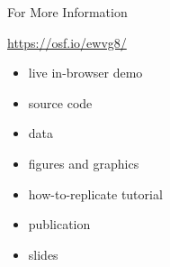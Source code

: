 \appendix

\begin{frame}{For More Information}

\vspace{1ex}

{\HUGE\url{https://osf.io/ewvg8/}}

\vspace{3ex}

\begin{itemize}
\item live in-browser demo
\item source code
\item data
\item figures and graphics
\item how-to-replicate tutorial
\item publication
\item slides
\end{itemize}

\end{frame}


